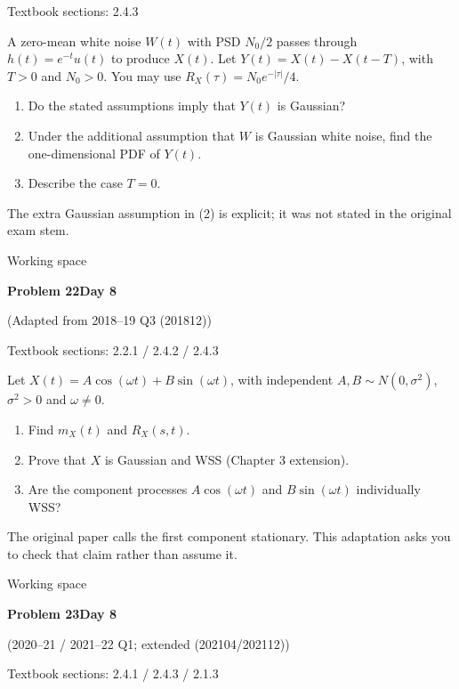 \documentclass[11pt]{article}
\newcommand{\qtitle}[2]{\clearpage\begin{tcolorbox}[colback=navy,colframe=navy,arc=1.5pt,boxrule=0pt]\color{white}\large\bfseries #1\hfill\small #2\end{tcolorbox}}
\begin{document}
{\small\color{muted}Textbook sections: 2.4.3}\par\medskip
\begin{tcolorbox}[colback=qbg,colframe=qbg,boxrule=0pt]A zero-mean white noise $W(t)$ with PSD $N_0/2$ passes through $h(t)=e^{-t}u(t)$ to produce $X(t)$. Let $Y(t)=X(t)-X(t-T)$, with $T>0$ and $N_0>0$.
You may use $R_X(\tau)=N_0e^{-|\tau|}/4$.
\begin{enumerate}\item Do the stated assumptions imply that $Y(t)$ is Gaussian?\item Under the additional assumption that $W$ is Gaussian white noise, find the one-dimensional PDF of $Y(t)$.\item Describe the case $T=0$.\end{enumerate}
The extra Gaussian assumption in (2) is explicit; it was not stated in the original exam stem.
\end{tcolorbox}\smallskip\begin{workspace}\hfill{\color{linec}\footnotesize Working space}\end{workspace}
\qtitle{Problem 22}{Day 8}
{\small\color{accentred}(Adapted from 2018--19 Q3 (201812))}\par\smallskip
{\small\color{muted}Textbook sections: 2.2.1 / 2.4.2 / 2.4.3}\par\medskip
\begin{tcolorbox}[colback=qbg,colframe=qbg,boxrule=0pt]Let $X(t)=A\cos(\omega t)+B\sin(\omega t)$, with independent $A,B\sim N(0,\sigma^2)$, $\sigma^2>0$ and $\omega\ne0$.
\begin{enumerate}\item Find $m_X(t)$ and $R_X(s,t)$.\item Prove that $X$ is Gaussian and WSS (Chapter 3 extension).\item Are the component processes $A\cos(\omega t)$ and $B\sin(\omega t)$ individually WSS?\end{enumerate}
The original paper calls the first component stationary. This adaptation asks you to check that claim rather than assume it.
\end{tcolorbox}\smallskip\begin{workspace}\hfill{\color{linec}\footnotesize Working space}\end{workspace}
\qtitle{Problem 23}{Day 8}
{\small\color{accentred}(2020--21 / 2021--22 Q1; extended (202104/202112))}\par\smallskip
{\small\color{muted}Textbook sections: 2.4.1 / 2.4.3 / 2.1.3}\par\medskip
\end{document}
